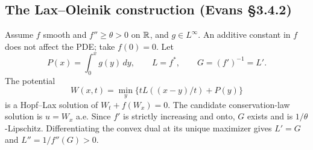 \subsection{The Lax--Oleinik construction (Evans \S3.4.2)}
\label{sec:3-laxoleinik}
Assume $f$ smooth and $f''\geq\theta>0$ on $\mathbb{R}$, and $g\in L^\infty$.
An additive constant in $f$ does not affect the PDE; take $f(0)=0$.
Let
\[
 P(x)=\int_0^xg(y)\,dy,\qquad
 L=f^*,\qquad G=(f')^{-1}=L'.
\]
The potential
\[
 W(x,t)=\min_y\{tL((x-y)/t)+P(y)\}
 \tag{LOP}
\]
is a Hopf--Lax solution of $W_t+f(W_x)=0$.
The candidate conservation-law solution is $u=W_x$ a.e.
\Needspace{45mm}
Since $f'$ is strictly increasing and onto, $G$ exists and is
$1/\theta$-Lipschitz. Differentiating the convex dual at its unique
maximizer gives $L'=G$ and $L''=1/f''(G)>0$.

